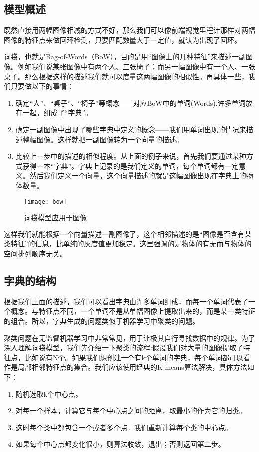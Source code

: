 \subsection{模型概述}
既然直接用两幅图像相减的方式不好，那么我们可以像前端视觉里程计那样对两幅图像的特征点来做回环检测，只要匹配数量大于一定值，就认为出现了回环。\par
词袋，也就是Bag-of-Words（BoW），目的是用“图像上的几种特征”来描述一副图像。例如我们说某张图像中有两个人、三张椅子；而另一幅图像中有一个人、一张桌子。那么根据这样的描述我们就可以度量这两幅图像的相似性。再具体一些，我们只要做以下的事情：
\begin{enumerate}
\item 确定“人”、“桌子”、“椅子”等概念——对应BoW中的单词(Words),许多单词放在一起，组成了“字典”。
\item 确定一副图像中出现了哪些字典中定义的概念——我们用单词出现的情况来描述整幅图像。这样就把一副图像转为一个向量的描述。
\item 比较上一步中的描述的相似程度。从上面的例子来说，首先我们要通过某种方式获得一本“字典”。字典上记录的是我们定义的单词，每个单词都有一定意义。然后我们定义一个向量，这个向量描述的就是这幅图像出现在字典上的物体数量。
\end{enumerate}\par
\begin{figure}[H]
	\centering
	\texttt{[image: bow]}
	\caption{词袋模型应用于图像}
\end{figure}
这样我们就能根据一个向量描述一副图像了，这个相邻描述的是“图像是否含有某类特征”的信息，比单纯的灰度值更加稳定。这里强调的是物体的有无而与物体的空间排列顺序无关。
\subsection{字典的结构} 
根据我们上面的描述，我们可以看出字典由许多单词组成，而每一个单词代表了一个概念。与特征点不同，一个单词不是从单幅图像上提取出来的，而是某一类特征的组合。所以，字典生成的问题类似于机器学习中聚类的问题。\par
聚类问题在无监督机器学习中非常常见，用于让极其自行寻找数据中的规律。为了深入理解词袋模型，我们先介绍一下聚类的流程:假设我们对大量的图像提取了特征点，比如说有N个。如果我们想创建一个有k个单词的字典，每个单词都可以看作是局部相邻特征点的集合。我们应该使用经典的K-means算法解决，具体方法如下：
\begin{enumerate}
\item 随机选取k个中心点。
\item 对每一个样本，计算它与每个中心点之间的距离，取最小的作为它的归类。
\item 这时每个类中都包含一个或者多个点，我们重新计算每个类的中心点。
\item 如果每个中心点都变化很小，则算法收敛，退出；否则返回第二步。
\end{enumerate}

